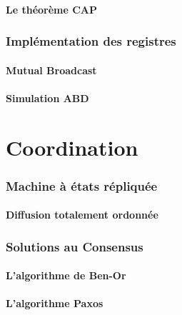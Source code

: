 \subsection{Le théorème CAP}



 
\section{Implémentation des registres}
 
\subsection{Mutual Broadcast}



 
\subsection{Simulation ABD}

 
 
\part{Coordination}
 
 
\section{Machine à états répliquée}
 
\subsection{Diffusion totalement ordonnée}






 
\section{Solutions au Consensus}
 
\subsection{L'algorithme de Ben-Or}







 
\subsection{L'algorithme Paxos}






\endgroup
\endinput
